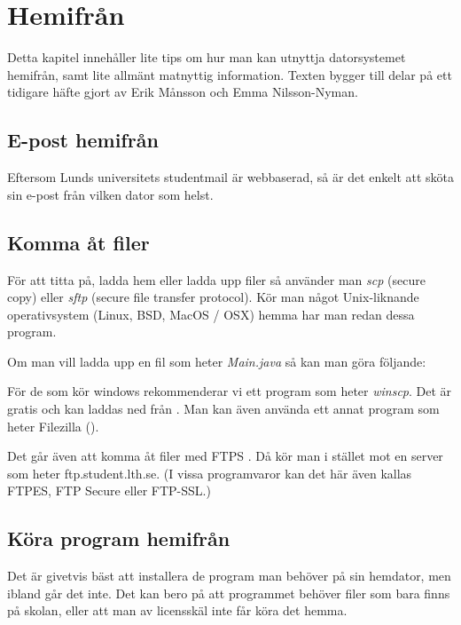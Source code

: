 \documentclass[a4paper,twocolumn]{book}
\begin{document}
\chapter{Hemifrån}
\label{cha:hemifran}

Detta kapitel innehåller lite tips om hur man kan utnyttja datorsystemet
hemifrån, samt lite allmänt matnyttig information. Texten bygger till
delar på ett tidigare häfte gjort av Erik Månsson och Emma Nilsson-Nyman.

\section{E-post hemifrån}

Eftersom Lunds universitets studentmail är webbaserad, så är det enkelt att
sköta sin e-post från vilken dator som helst.


\section{Komma åt filer}

För att titta på, ladda hem eller ladda upp filer så använder man \emph{scp}
(secure copy) eller \emph{sftp} (secure file transfer protocol). Kör man något
Unix-liknande operativsystem (Linux, BSD, MacOS / OSX) hemma har man redan dessa
program.

Om man vill ladda upp en fil som heter \emph{Main.java} så kan man göra följande:



För de som kör windows rekommenderar vi ett program som heter \emph{winscp}.
Det är gratis och kan laddas ned från . Man kan även
använda ett annat program som heter Filezilla
().

Det går även att komma åt filer med FTPS . Då kör man i stället mot en server
som heter ftp.student.lth.se. (I vissa programvaror kan det här även kallas
FTPES, FTP Secure eller FTP-SSL.)


\section{Köra program hemifrån}

Det är givetvis bäst att installera de program man behöver på sin hemdator,
men ibland går det inte. Det kan bero på att programmet behöver filer som bara
finns på skolan, eller att man av licensskäl inte får köra det hemma.
\end{document}

